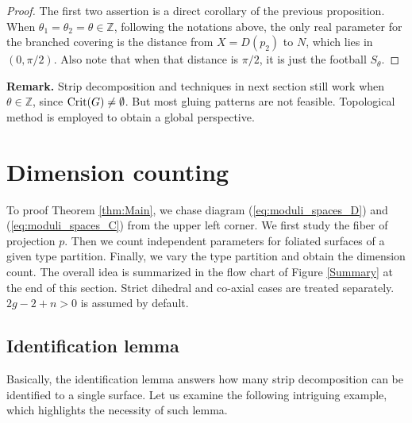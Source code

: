 \documentclass[pdflatex,sn-mathphys]{sn-jnl}%
\numberwithin{equation}{section}
\theoremstyle{thmstyleone}%
\newcommand{\ZZ}{\mathbb{Z}}
\begin{document}
\begin{proof}
    The first two assertion is a direct corollary of the previous proposition.
    When $\theta_1=\theta_2=\theta\in\ZZ$, following the notations above, the only real parameter for the branched covering is the distance from $X=D(p_2)$ to $N$, which lies in $(0,\pi/2)$. Also note that when that distance is $\pi/2$, it is just the football $S_{\theta}$. 
\end{proof}

\textbf{Remark.} Strip decomposition and techniques in next section still work when $\theta\in\ZZ$, since $\mathrm{Crit}(G)\neq\emptyset$. But most gluing patterns are not feasible. %
Topological method is employed to obtain a global perspective.

\section{Dimension counting}\label{sec:Dimension}
To proof Theorem \ref{thm:Main}, we chase diagram (\ref{eq:moduli_spaces_D}) and (\ref{eq:moduli_spaces_C}) from the upper left corner. We first study the fiber of projection $p$. %
Then we count independent parameters for foliated surfaces of a given type partition. Finally, we vary the type partition and obtain the dimension count. The overall idea is summarized in the flow chart of Figure \ref{Summary} at the end of this section. 
Strict dihedral and co-axial cases are treated separately. $2g-2+n>0$ is assumed by default.

\subsection{Identification lemma}
\label{subsec:iden}
Basically, the identification lemma answers how many strip decomposition can be identified to a single surface.
Let us examine the following intriguing example, which highlights the necessity of such lemma.
\end{document}
